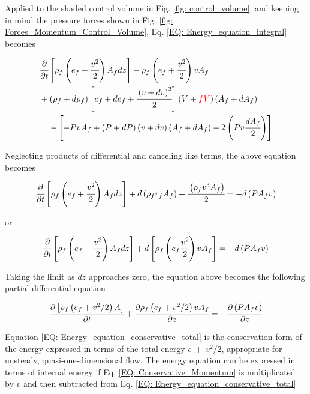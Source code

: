 \documentclass[../Article_Model_Parameters.tex]{subfiles}
\begin{document}
	Applied to the shaded control volume in Fig. \ref{fig: control_volume}, and keeping in mind the pressure forces shown in Fig. \ref{fig: Forces_Momentum_Control_Volume}, Eq. \ref{EQ: Energy_equation_integral} becomes
	
	{\footnotesize
		\begin{align}
			&\cfrac{\partial}{\partial t} \left[ \rho_f \left( e_f + \cfrac{v^2}{2} \right) A_f dz \right] - \rho_f \left( e_f + \cfrac{v^2}{2} \right) v A_f \nonumber \\
			&+ \left( \rho_f + d\rho_f \right) \left[ e_f + de_f + \cfrac{\left( v + dv \right)^2}{2} \right] \left( V+{\color{red}fV} \right) \left( A_f+dA_f \right) \nonumber \\
			&= - \left[ -PvA_f + \left(P+dP\right) \left(v+dv\right) \left(A_f+dA_f\right) - 2\left( Pv\cfrac{dA_f}{2} \right) \right]
		\end{align}
	} 
	
	Neglecting products of differential and canceling like terms, the above equation becomes
	
	{\footnotesize
		\begin{equation}
			\cfrac{\partial}{\partial t} \left[ \rho_f \left( e_f + \cfrac{v^2}{2} \right) A_f dz \right] + d\left( \rho_f r_f A_f \right) + \cfrac{ \left( \rho_f v^3 A_f \right) }{2} = -d \left( P A_f v \right)
		\end{equation}
	}

	or
	
	{\footnotesize
		\begin{equation}
			\cfrac{\partial}{\partial t} \left[ \rho_f \left( e_f + \cfrac{v^2}{2} \right) A_f dz \right] + d \left[ \rho_f \left( e_f \cfrac{v^2}{2} \right) vA_f \right] = - d\left( P A_f v \right)
		\end{equation}
	}

	Taking the limit as $dz$ approaches zero, the equation above becomes the following partial differential equation
	
	{\footnotesize
		\begin{equation}
			\cfrac{\partial \left[ \rho_f \left( e_f + v^2 / 2 \right) A \right]}{\partial t} + \cfrac{\partial \rho_f \left( e_f + v^2 / 2 \right)vA_f}{\partial z} = -\cfrac{\partial \left( P A_f v \right)}{\partial z}
			\label{EQ: Energy_equation_conservative_total}
		\end{equation}
	}
	
	Equation \ref{EQ: Energy_equation_conservative_total} is the conservation form of the energy expressed in terms of the total energy $e~+~v^2/2$, appropriate for unsteady, quasi-one-dimensional flow. The energy equation can be expressed in terms of internal energy if Eq. \ref{EQ: Conservative_Momentum} is multiplicated by $v$ and then subtracted from Eq. \ref{EQ: Energy_equation_conservative_total}
	
\end{document}
